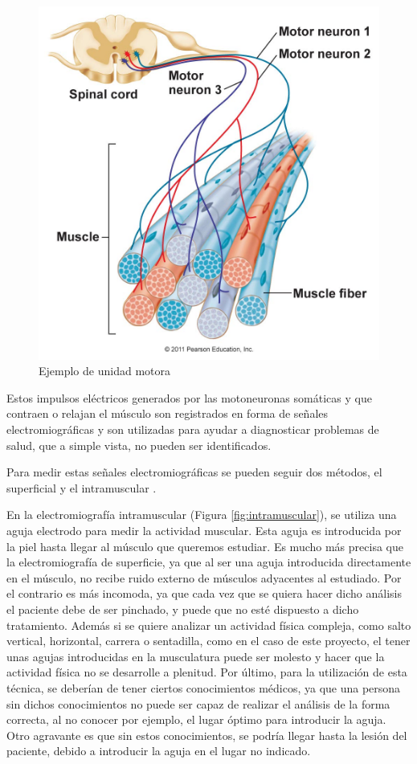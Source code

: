 \begin{figure}[ht]
\centering
\includegraphics[scale=0.4]{imagenes/unidad motora.jpg}
\caption{Ejemplo de unidad motora \cite{unidadmotora}}
\label{fig:unidad motora}
\end{figure}

Estos impulsos eléctricos generados por las motoneuronas somáticas y que contraen o relajan el músculo son registrados en forma de señales electromiográficas y son utilizadas para ayudar a diagnosticar problemas de salud, que a simple vista, no pueden ser identificados. 

Para medir estas señales electromiográficas se pueden seguir dos métodos, el superficial y el intramuscular \cite{konrad2005abc}.

En la electromiografía intramuscular (Figura \ref{fig:intramuscular}), se utiliza una aguja electrodo para medir la actividad muscular. Esta aguja es introducida por la piel hasta llegar al músculo que queremos estudiar. Es mucho más precisa que la electromiografía de superficie, ya que al ser una aguja introducida directamente en el músculo, no recibe ruido externo de músculos adyacentes al estudiado. Por el contrario es más incomoda, ya que cada vez que se quiera hacer dicho análisis el paciente debe de ser pinchado, y puede que no esté dispuesto a dicho tratamiento. Además si se quiere analizar un actividad física compleja, como salto vertical, horizontal, carrera o sentadilla, como en el caso de este proyecto, el tener unas agujas introducidas en la musculatura puede ser molesto y hacer que la actividad física no se desarrolle a plenitud. Por último, para la utilización de esta técnica, se deberían de tener ciertos conocimientos médicos, ya que una persona sin dichos conocimientos no puede ser capaz de realizar el análisis de la forma correcta, al no conocer por ejemplo, el lugar óptimo para introducir la aguja. Otro agravante es que sin estos conocimientos, se podría llegar hasta la lesión del paciente, debido a introducir la aguja en el lugar no indicado. 

